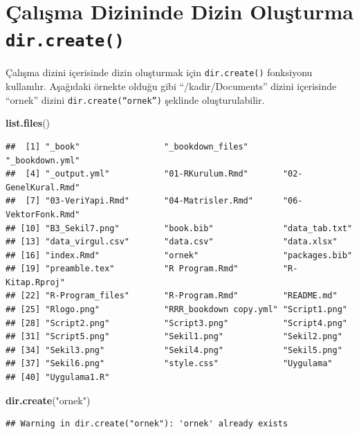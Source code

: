 \documentclass[
]{book}
\newenvironment{Shaded}{\begin{snugshade}}{\end{snugshade}}
\newcommand{\FunctionTok}[1]{\textcolor[rgb]{0.13,0.29,0.53}{\textbf{#1}}}
\newcommand{\NormalTok}[1]{#1}
\newcommand{\StringTok}[1]{\textcolor[rgb]{0.31,0.60,0.02}{#1}}
\begin{document}
\section{\texorpdfstring{Çalışma Dizininde Dizin Oluşturma \texttt{dir.create()}}{Çalışma Dizininde Dizin Oluşturma dir.create()}}\label{uxe7alux131ux15fma-dizininde-dizin-oluux15fturma-dir.create}

Çalışma dizini içerisinde dizin oluşturmak için \texttt{dir.create()} fonksiyonu kullanılır. Aşağıdaki örnekte olduğu gibi ``/kadir/Documents'' dizini içerisinde ``ornek'' dizini \texttt{dir.create(“ornek”)} şeklinde oluşturulabilir.

\begin{Shaded}
\begin{Highlighting}[]
\FunctionTok{list.files}\NormalTok{()}
\end{Highlighting}
\end{Shaded}

\begin{verbatim}
##  [1] "_book"                 "_bookdown_files"       "_bookdown.yml"        
##  [4] "_output.yml"           "01-RKurulum.Rmd"       "02-GenelKural.Rmd"    
##  [7] "03-VeriYapi.Rmd"       "04-Matrisler.Rmd"      "06-VektorFonk.Rmd"    
## [10] "B3_Sekil7.png"         "book.bib"              "data_tab.txt"         
## [13] "data_virgul.csv"       "data.csv"              "data.xlsx"            
## [16] "index.Rmd"             "ornek"                 "packages.bib"         
## [19] "preamble.tex"          "R Program.Rmd"         "R-Kitap.Rproj"        
## [22] "R-Program_files"       "R-Program.Rmd"         "README.md"            
## [25] "Rlogo.png"             "RRR_bookdown copy.yml" "Script1.png"          
## [28] "Script2.png"           "Script3.png"           "Script4.png"          
## [31] "Script5.png"           "Sekil1.png"            "Sekil2.png"           
## [34] "Sekil3.png"            "Sekil4.png"            "Sekil5.png"           
## [37] "Sekil6.png"            "style.css"             "Uygulama"             
## [40] "Uygulama1.R"
\end{verbatim}

\begin{Shaded}
\begin{Highlighting}[]
\FunctionTok{dir.create}\NormalTok{(}\StringTok{"ornek"}\NormalTok{)}
\end{Highlighting}
\end{Shaded}

\begin{verbatim}
## Warning in dir.create("ornek"): 'ornek' already exists
\end{verbatim}
\end{document}
